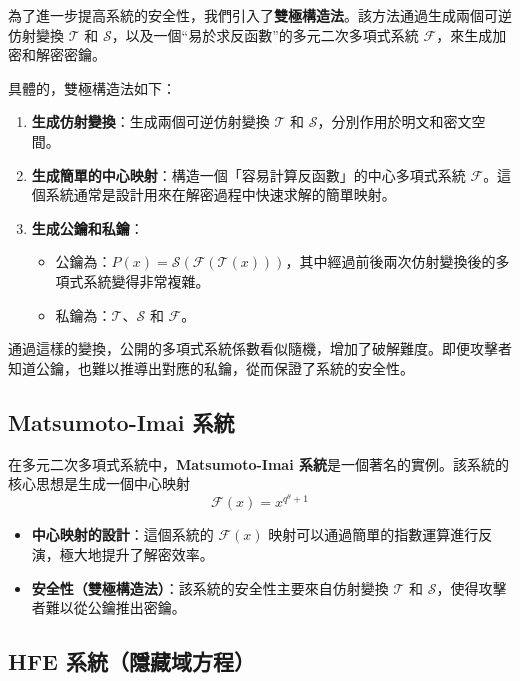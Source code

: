 \documentclass[
]{article}
\providecommand{\tightlist}{%
  \setlength{\itemsep}{0pt}\setlength{\parskip}{0pt}}
\begin{document}
為了進一步提高系統的安全性，我們引入了\textbf{雙極構造法}。該方法通過生成兩個可逆仿射變換
\(\mathcal{T}\) 和
\(\mathcal{S}\)，以及一個``易於求反函數''的多元二次多項式系統
\(\mathcal{F}\)，來生成加密和解密密鑰。

具體的，雙極構造法如下：

\begin{enumerate}
\def\labelenumi{\arabic{enumi}.}
\tightlist
\item
  \textbf{生成仿射變換}：生成兩個可逆仿射變換 \(\mathcal{T}\) 和
  \(\mathcal{S}\)，分別作用於明文和密文空間。
\item
  \textbf{生成簡單的中心映射}：構造一個「容易計算反函數」的中心多項式系統
  \(\mathcal{F}\)。這個系統通常是設計用來在解密過程中快速求解的簡單映射。
\item
  \textbf{生成公鑰和私鑰}：

  \begin{itemize}
  \tightlist
  \item
    公鑰為：\(P(x) = \mathcal{S}(\mathcal{F}(\mathcal{T}(x)))\)，其中經過前後兩次仿射變換後的多項式系統變得非常複雜。
  \item
    私鑰為：\(\mathcal{T}\)、\(\mathcal{S}\) 和 \(\mathcal{F}\)。
  \end{itemize}
\end{enumerate}

通過這樣的變換，公開的多項式系統係數看似隨機，增加了破解難度。即便攻擊者知道公鑰，也難以推導出對應的私鑰，從而保證了系統的安全性。

\hypertarget{matsumoto-imai-ux7cfbux7d71}{%
\subsection{Matsumoto-Imai 系統}\label{matsumoto-imai-ux7cfbux7d71}}

在多元二次多項式系統中，\textbf{Matsumoto-Imai
系統}是一個著名的實例。該系統的核心思想是生成一個中心映射
\[\mathcal{F}(x) = x^{q^{\theta} + 1}\]

\begin{itemize}
\tightlist
\item
  \textbf{中心映射的設計}：這個系統的 \(\mathcal{F}(x)\)
  映射可以通過簡單的指數運算進行反演，極大地提升了解密效率。
\item
  \textbf{安全性（雙極構造法）}：該系統的安全性主要來自仿射變換
  \(\mathcal{T}\) 和 \(\mathcal{S}\)，使得攻擊者難以從公鑰推出密鑰。
\end{itemize}

\hypertarget{hfe-ux7cfbux7d71ux96b1ux85cfux57dfux65b9ux7a0b}{%
\subsection{HFE
系統（隱藏域方程）~}\label{hfe-ux7cfbux7d71ux96b1ux85cfux57dfux65b9ux7a0b}}
\end{document}
